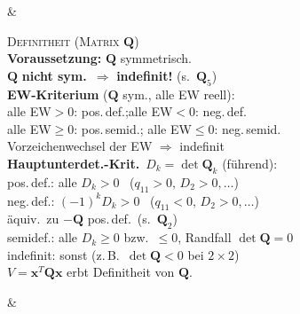 \begin{formelreihe}
   &
  \parbox[t]{\linewidth}{%
    {\scriptsize\scshape\color{gray!65!black} Definitheit (Matrix $\mathbf{Q}$)}\\[0.03em]%
    \scriptsize
    \textbf{Voraussetzung:} $\mathbf{Q}$ symmetrisch.\\[0.02em]
    \quad$\mathbf{Q}$ \textbf{nicht sym.}\ $\Rightarrow$ \textbf{indefinit!} (s.\ $\mathbf{Q}_5$)\\[0.05em]
    \textbf{EW-Kriterium} ($\mathbf{Q}$ sym., alle EW reell):\\[0.02em]
    \quad alle EW$>0$: pos.\,def.;\quad alle EW$<0$: neg.\,def.\\[0.02em]
    \quad alle EW$\geq0$: pos.\,semid.;\; alle EW$\leq0$: neg.\,semid.\\[0.02em]
    \quad Vorzeichenwechsel der EW $\Rightarrow$ indefinit\\[0.05em]
    \textbf{Hauptunterdet.-Krit.}\ $D_k=\det\mathbf{Q}_k$ (führend):\\[0.02em]
    \quad pos.\,def.: alle $D_k>0$ \ ($q_{11}>0,\,D_2>0,\dots$)\\[0.02em]
    \quad neg.\,def.: $(-1)^k D_k>0$ \ ($q_{11}<0,\,D_2>0,\dots$)\\[0.02em]
    \qquad äquiv.\ zu $-\mathbf{Q}$ pos.\,def.\ (s.\ $\mathbf{Q}_2$)\\[0.02em]
    \quad semidef.: alle $D_k\geq0$ bzw.\ $\leq0$, Randfall $\det\mathbf{Q}=0$\\[0.02em]
    \quad indefinit: sonst (z.\,B.\ $\det\mathbf{Q}<0$ bei $2\!\times\!2$)\\[0.05em]
    $V=\mathbf{x}^T\!\mathbf{Q}\mathbf{x}$ erbt Definitheit von $\mathbf{Q}$.} &
\end{formelreihe}
